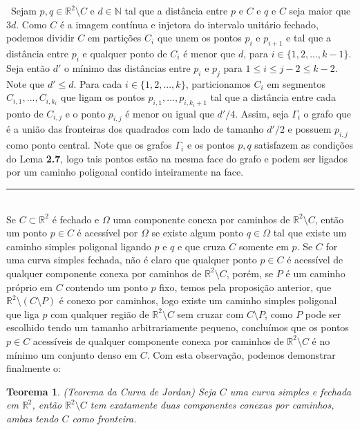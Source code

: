 \documentclass[12pt,a4paper]{article}
\newtheorem{thrm}[mydef]{Teorema}
\def\dem{\par\smallbreak\noindent {\textit{ Demonstração:}} \ }
\def\eop{\hfill\rule{2.5mm}{2.5mm} \\ }
\theoremstyle{definition}
\begin{document}
\dem Sejam $p,q\in \mathbb{R}^2\setminus C$ e $d\in \mathbb{N}$ tal que a distância entre $p$ e $C$ e $q$ e $C$ seja maior que $3d$. Como $C$ é a imagem contínua e injetora do intervalo unitário fechado, podemos dividir $C$ em partições $C_i$ que unem os pontos $p_i$ e $p_{i+1}$ e tal que a distância entre $p_i$ e qualquer ponto de $C_i$ é menor que $d$, para $i\in \{1,2,...,k-1\}$. Seja então $d'$ o mínimo das distâncias entre $p_i$ e $p_j$ para $1\leq i\leq j-2 \leq k-2$. Note que $d'\leq d$. Para cada $i\in \{1,2,...,k\}$, particionamos $C_i$ em segmentos $C_{i,1},...,C_{i,k_i}$ que ligam os pontos $p_{i,1},...,p_{i,k_i +1}$ tal que a distância entre cada ponto de $C_{i,j}$ e o ponto $p_{i,j}$ é menor ou igual que $d'/4$. Assim, seja $\Gamma_i$ o grafo que é a união das fronteiras dos quadrados com lado de tamanho $d'/2$ e possuem $p_{i,j}$ como ponto central. Note que os grafos $\Gamma_i$ e os pontos $p,q$ satisfazem as condições do Lema \textbf{2.7}, logo tais pontos estão na mesma face do grafo e podem ser ligados por um caminho poligonal contido inteiramente na face.  \eop

Se $C\subset \mathbb{R}^2$ é fechado e $\Omega$ uma componente conexa por caminhos de $\mathbb{R}^2\setminus C$, então um ponto $p\in C$ é acessível por $\Omega$ se existe algum ponto $q\in \Omega$ tal que existe um caminho simples poligonal ligando $p$ e $q$ e que cruza $C$ somente em $p$. Se $C$ for uma curva simples fechada, não é claro que qualquer ponto $p\in C$ é acessível de qualquer componente conexa por caminhos de $\mathbb{R}^2\setminus C$, porém, se $P$ é um caminho próprio em $C$ contendo um ponto $p$ fixo, temos pela proposição anterior, que $\mathbb{R}^2\setminus (C\setminus P)$ é conexo por caminhos, logo existe um caminho simples poligonal que liga $p$ com qualquer região de $\mathbb{R}^2\setminus C$ sem cruzar com $C\setminus P$, como $P$ pode ser escolhido tendo um tamanho arbitrariamente pequeno, concluímos que os pontos $p \in C$ acessíveis de qualquer componente conexa por caminhos de $\mathbb{R}^2\setminus C$ é no mínimo um conjunto denso em $C$. Com esta observação, podemos demonstrar finalmente o:

\begin{thrm}
 
    (Teorema da Curva de Jordan) Seja $C$ uma curva simples e fechada em $\mathbb{R}^2$, então $\mathbb{R}^2\setminus C$ tem exatamente duas componentes conexas por caminhos, ambas tendo $C$ como fronteira.
 
\end{thrm}
\end{document}
